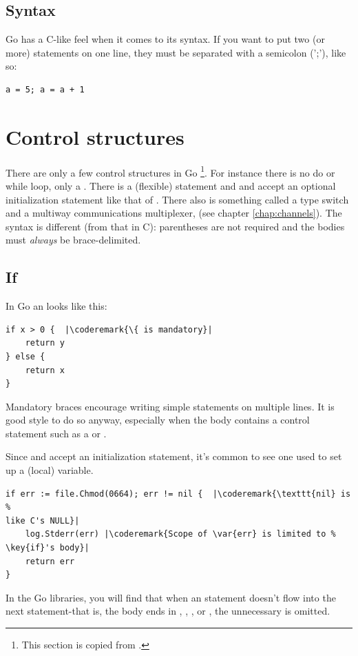 \subsection{Syntax}
Go has a C-like feel when it comes to its syntax. 
If you want to put two (or more) statements on one line, they must be
separated with a semicolon (';'), like so:
\begin{lstlisting}
a = 5; a = a + 1
\end{lstlisting}

\section{Control structures}
There are only a few control structures in 
Go \footnote{This section is copied from \cite{effective_go}.}.
For instance there is no do or while loop, only a 
. There is a (flexible)  statement and  and
 accept an
optional initialization statement like that of . There also is
something called a type switch and a multiway communications
multiplexer,  (see chapter \ref{chap:channels}). The syntax is 
different (from that in C): parentheses
are not required and the bodies must \emph{always} be brace-delimited.

\subsection{If}
In Go an  looks like this:
\begin{lstlisting}
if x > 0 {	|\coderemark{\{ is mandatory}|
    return y
} else {
    return x
}
\end{lstlisting}
Mandatory braces encourage writing simple  statements on multiple
lines. It is good style to do so anyway, especially when the body
contains a control statement such as a
 or
.

Since  and  accept an initialization statement, it's common to
see one used to set up a (local) variable.
\begin{lstlisting}
if err := file.Chmod(0664); err != nil {  |\coderemark{\texttt{nil} is %
like C's NULL}|
    log.Stderr(err) |\coderemark{Scope of \var{err} is limited to %
\key{if}'s body}|
    return err
}
\end{lstlisting}
In the Go libraries, you will find that when an  statement doesn't flow
into the next statement-that is, the body ends in ,
, ,
or , the unnecessary  is omitted.

